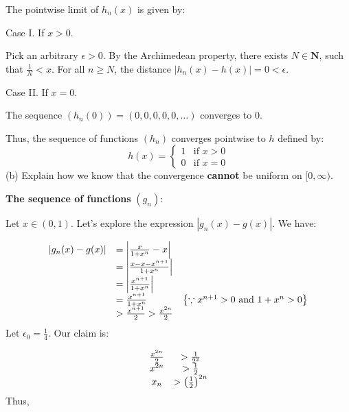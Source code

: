 \documentclass[10pt]{article}
\begin{document}
The pointwise limit of $\displaystyle h_{n}( x)$ is given by:



Case I. If $\displaystyle x >0$.



Pick an arbitrary $\displaystyle \epsilon  >0$. By the Archimedean property, there exists $\displaystyle N\in \mathbf{N}$, such that $\displaystyle \frac{1}{N} < x$. For all $\displaystyle n\geq N$, the distance $\displaystyle |h_{n}( x) -h( x) |=0< \epsilon $. 



Case II. If $\displaystyle x=0$.



The sequence $\displaystyle ( h_{n}( 0)) =( 0,0,0,0,0,\dotsc )$ converges to $\displaystyle 0$.



Thus, the sequence of functions $\displaystyle ( h_{n})$ converges pointwise to $\displaystyle h$ defined by:
\begin{equation*}
h( x) =\begin{cases}
1 & \text{if } x >0\\
0 & \text{if } x=0
\end{cases}
\end{equation*}
(b) Explain how we know that the convergence \textbf{cannot} be uniform on $\displaystyle [ 0,\infty )$.



\textbf{The sequence of functions }$\displaystyle ( g_{n})$:



Let $\displaystyle x\in ( 0,1)$. Let's explore the expression $\displaystyle |g_{n}( x) -g( x) |$. We have:


\begin{equation*}
\begin{array}{ c l c }
|g_{n}( x) -g( x) | & =\left| \frac{x}{1+x^{n}} -x\right|  & \\
 & =\left| \frac{x-x-x^{n+1}}{1+x^{n}}\right|  & \\
 & =\left| \frac{x^{n+1}}{1+x^{n}}\right|  & \\
 & =\frac{x^{n+1}}{1+x^{n}} & \left\{\because x^{n+1}  >0\ \text{and } 1+x^{n}  >0\right\}\\
 &  >\frac{x^{n+1}}{2}  >\frac{x^{2n}}{2} & 
\end{array}
\end{equation*}
Let $\displaystyle \epsilon _{0} =\frac{1}{4}$. Our claim is:


\begin{equation*}
\begin{array}{ c c }
\frac{x^{2n}}{2} &  >\frac{1}{2^{2}}\\
x^{2n} &  >\frac{1}{2}\\
x_{n} &  >\left(\frac{1}{2}\right)^{2n}
\end{array}
\end{equation*}
Thus,
\end{document}
